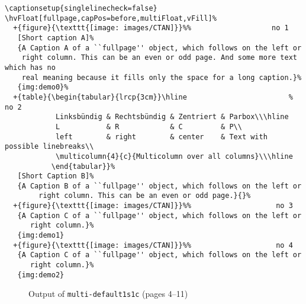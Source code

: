 \documentclass[twoside,paper=a4,usegeometry]{scrartcl}
\begin{document}
\begin{lstlisting}
\captionsetup{singlelinecheck=false}
\hvFloat[fullpage,capPos=before,multiFloat,vFill]%
  +{figure}{\texttt{[image: images/CTAN]}}%%                   no 1
   [Short caption A]%
   {A Caption A of a ``fullpage'' object, which follows on the left or
    right column. This can be an even or odd page. And some more text which has no
    real meaning because it fills only the space for a long caption.}%
   {img:demo0}%
  +{table}{\begin{tabular}{lrcp{3cm}}\hline                        %             no 2
            Linksbündig & Rechtsbündig & Zentriert & Parbox\\\hline
            L           & R            & C         & P\\
            left        & right        & center    & Text with possible linebreaks\\
            \multicolumn{4}{c}{Multicolumn over all columns}\\\hline
           \end{tabular}}%
   [Short Caption B]%
   {A Caption B of a ``fullpage'' object, which follows on the left or
        right column. This can be an even or odd page.}{}%
  +{figure}{\texttt{[image: images/CTAN]}}%%                    no 3
   {A Caption C of a ``fullpage'' object, which follows on the left or
      right column.}%
   {img:demo1}
  +{figure}{\texttt{[image: images/CTAN]}}%%                    no 4
   {A Caption C of a ``fullpage'' object, which follows on the left or
      right column.}%
   {img:demo2}
\end{lstlisting}


\begin{figure}[!h]
\hfill
{}\hfill
{}\hfill
{}

\hfill
{}\hfill
{}\hfill
{}
\caption{Output of \texttt{multi-default1s1c} (pages 4--11)}\label{multi-default1s1c}
\end{figure}
\end{document}
